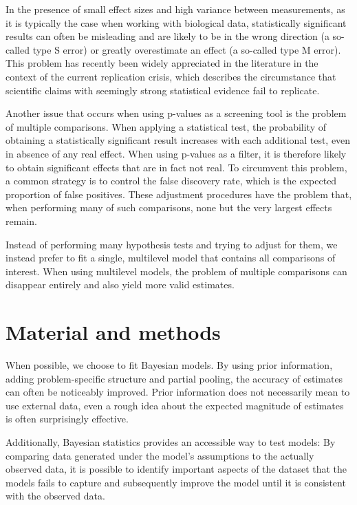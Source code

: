 \documentclass[fleqn,11pt]{SelfArx} %
\begin{document}
In the presence of small effect sizes and high variance between measurements, as  it is typically the case when working with biological data, statistically significant results can often be misleading and are likely to be in the wrong direction (a so-called type S error) or greatly overestimate an effect (a so-called type M error)\nolinebreak\cite{Gelman2014}. This problem has recently been widely appreciated in the literature in the context of the current \glqq replication crisis\grqq{}, which describes the circumstance that scientific claims with seemingly strong statistical evidence fail to replicate\nolinebreak\cite{Ioannidis2005}.

Another issue that occurs when using p-values as a screening tool is the problem of multiple comparisons. When applying a statistical test, the probability  of  obtaining a statistically significant result increases with each additional test, even in absence of any real effect. When using p-values as a filter, it is therefore likely to obtain significant effects that are in fact not real. To circumvent this problem, a common strategy is to control the false discovery rate, which is the expected proportion of false positives\nolinebreak\cite{Benjamini1995}. These adjustment procedures have the problem that, when performing many of such comparisons, none but the very largest effects remain.

Instead of performing many hypothesis tests and trying to adjust for them, we instead prefer to fit a single, multilevel model that contains all comparisons of interest. When using multilevel models, the problem of multiple comparisons can disappear entirely and  also yield more valid estimates\nolinebreak\cite{Gelman2012}.

\section{Material and methods}

When possible, we choose to fit Bayesian models. By using prior information, adding problem-specific structure and partial pooling, the accuracy of estimates can often be noticeably improved\nolinebreak\cite{Gelman2010}. Prior information does not necessarily mean to use external data, even a rough idea about the expected magnitude of estimates is often surprisingly effective.

Additionally, Bayesian statistics provides an accessible way to test models: By comparing data generated under the model's assumptions to the actually observed data, it is possible to identify important aspects of the dataset that the models fails to capture and subsequently improve the model until it is consistent with the observed data\nolinebreak\cite{Gabry2019}.
\end{document}
